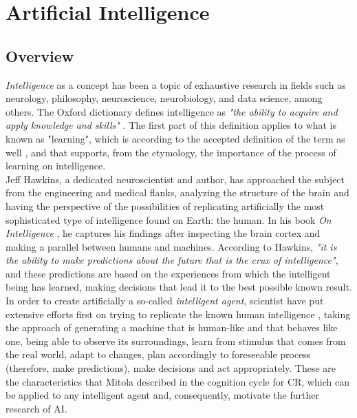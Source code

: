 \acresetall
\chapter{Artificial Intelligence}\label{ch:ml_intro}

\section{Overview}
\emph{Intelligence} as a concept has been a topic of exhaustive research in fields such as neurology, philosophy, neuroscience, neurobiology, and data science, among others. The Oxford dictionary defines intelligence as \emph{"the ability to acquire and apply knowledge and skills"} \cite{Oxforda}. The first part of this definition applies to what is known as "learning", which is according to the accepted definition of the term as well \cite{Oxford}, and that supports, from the etymology, the importance of the process of learning on intelligence.\\

Jeff Hawkins, a dedicated neuroscientist and author, has approached the subject from the engineering and medical flanks, analyzing the structure of the brain and having the perspective of the possibilities of replicating artificially the most sophisticated type of intelligence found on Earth: the human. In his book \emph{On Intelligence} \cite{HawkinsJeff2004}, he captures his findings after inspecting the brain cortex and making a parallel between humans and machines. According to Hawkins, \emph{"it is the ability to make predictions about the future that is the crux of intelligence"}, and these predictions are based on the experiences from which the intelligent being has learned, making decisions that lead it to the best possible known result. In order to create artificially a so-called \emph{intelligent agent}, scientist have put extensive efforts first on trying to replicate the known human intelligence \cite{Brooks1991}\cite{Reed2007}\cite{Hawkins}, taking the approach of generating a machine that is human-like and that behaves like one, being able to observe its surroundings, learn from stimulus that comes from the real world, adapt to changes, plan accordingly to foreseeable process (therefore, make predictions), make decisions and act appropriately. These are the characteristics that Mitola \cite{Mitola1999} described in the cognition cycle for \ac{CR}, which can be applied to any intelligent agent and, consequently, motivate the further research of \ac{AI}.\\

